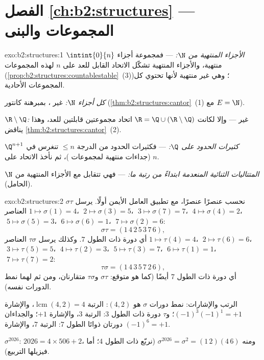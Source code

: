 \section*{الفصل \ref{ch:b2:structures} --- المجموعات والبنى}

\begin{solution}{exo:b2:structures:1}
\emph{الأجزاء المنتهية من $\N$:}  --- فمجموعة أجزاء
$\intint{0}{n}$ منتهية، والأجزاء المنتهية تشكّل الاتحاد القابل للعد
على $n$ لهذه المجموعات
(\cref{prop:b2:structures:countablestable}~(3))؛ وهي غير منتهية لأنها
تحتوي كل المجموعات الأحادية.

\emph{كل أجزاء $\N$:} غير ، بمبرهنة كانتور
(\cref{thm:b2:structures:cantor}~(1) مع $E = \N$).

\emph{$\R \setminus \Q$:} غير  --- وإلا لكانت $\R = \Q \cup
(\R\setminus\Q)$ اتحاد مجموعتين قابلتين للعد،
وهذا يناقض \cref{thm:b2:structures:cantor}~(2).

\emph{كثيرات الحدود على $\Q$:}  --- فكثيرات الحدود من الدرجة
$\leq n$ تنغرس في $\Q^{n+1}$ (جداءات منتهية لمجموعات )،
ثم نأخذ الاتحاد على $n$.

\emph{المتتاليات الثنائية المنعدمة ابتداءً من رتبة ما:}  ---
فهي تتقابل مع الأجزاء المنتهية من $\N$ (الحامل).
\end{solution}

\begin{solution}{exo:b2:structures:2}
نحسب عنصرًا عنصرًا، مع تطبيق العامل الأيمن أولًا.
يرسل $\sigma\tau$ العناصر $1 \mapsto \sigma(1) = 4$، $\;2 \mapsto \sigma(3)
= 5$، $\;3 \mapsto \sigma(7) = 7$، $\;4 \mapsto \sigma(4) = 2$، $\;5
\mapsto \sigma(5) = 3$، $\;6 \mapsto \sigma(6) = 1$، $\;7 \mapsto
\sigma(2) = 6$:
\[
\sigma\tau = (1\,4\,2\,5\,3\,7\,6),
\]
أي دورة ذات الطول $7$. وكذلك يرسل $\tau\sigma$ العناصر $1 \mapsto \tau(4) = 4$،
$\;2 \mapsto \tau(6) = 6$، $\;3 \mapsto \tau(5) = 5$، $\;4 \mapsto
\tau(2) = 3$، $\;5 \mapsto \tau(3) = 7$، $\;6 \mapsto \tau(1) = 1$،
$\;7 \mapsto \tau(7) = 2$:
\[
\tau\sigma = (1\,4\,3\,5\,7\,2\,6),
\]
أي دورة ذات الطول $7$ أيضًا (كما هو متوقع: $\sigma\tau$ و$\tau\sigma$
متقارنان، ومن ثم لهما نمط الدورات نفسه).

الرتب والإشارات: نمط دورات $\sigma$ هو $(4,2)$: الرتبة
$\operatorname{lcm}(4,2) = 4$، والإشارة $(-1)^3(-1)^1 = +1$؛ و$\tau$
دورة ذات الطول $3$: الرتبة $3$، والإشارة $+1$؛ والجداءان دورتان
ذواتَا الطول $7$: الرتبة $7$، والإشارة $(-1)^6 = +1$.

$\sigma^{2026}$: $2026 = 4 \times 506 + 2$، ومنه $\sigma^{2026} =
\sigma^2 = (1\,2)(4\,6)$ (نربّع  ذات الطول $4$؛ أما 
فيزيلها التربيع).
\end{solution}

